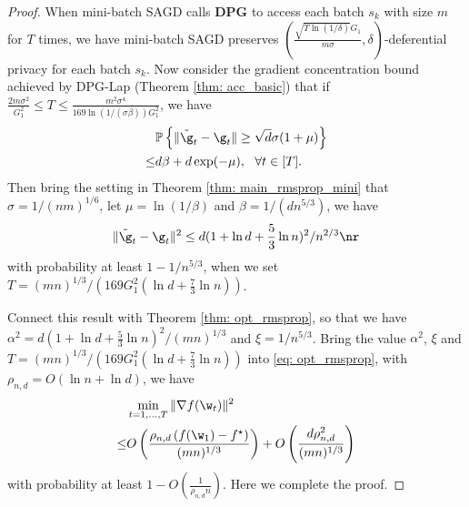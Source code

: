 \theomini*

\begin{proof} When mini-batch SAGD calls \textbf{DPG} to access each batch $s_k$ with size $m$ for $T$ times, we have mini-batch SAGD preserves $(\frac{\sqrt{T \ln(1/\delta)} G_1}{m\sigma}, \delta)$-deferential privacy for each batch $s_k$. Now consider the gradient concentration bound achieved by DPG-Lap (Theorem \ref{thm: acc_basic}) that if $ \frac{2m\sigma^2}{G_1^2}\leq T \leq \frac{m^2 \sigma^4}{169 \ln(1/(\sigma \beta))G_1^2}$, we have 
\begin{align*}
&\mathbb{P}\left\{\|\tilde \g_t - \g_t\| \geq \sqrt{d}\sigma(1+\mu)\right\} \\ 
\leq& d\beta + d\exp(-\mu), \ \ \forall t \in [T]. 
\end{align*}
Then bring the setting in Theorem \ref{thm: main_rmsprop_mini} that $\sigma = 1/(nm)^{1/6}$, let $\mu = \ln (1/\beta)$ and $\beta = 1/(d n^{5/3})$, we have
\begin{equation}
 \|\tilde \g_t - \g_t\|^2 \leq d(1+\ln d + \frac{5}{3}\ln n)^2/n^{2/3}   \nr
\end{equation}
with probability at least $1- 1/n^{5/3}$, when we set\\ $T = (mn)^{1/3}/\left(169G_1^2(\ln d + \frac{7}{3}\ln n)\right)$. 


Connect this result with Theorem \ref{thm: opt_rmsprop}, so that we have $\alpha^2 = d(1+\ln d + \frac{5}{3}\ln n)^2/(mn)^{1/3}$ and $\xi = 1/n^{5/3}$. Bring the value $\alpha^2$, $\xi$ and $T = (mn)^{1/3}/\left(169G_1^2(\ln d + \frac{7}{3}\ln n)\right)$ into \eqref{eq: opt_rmsprop}, with $\rho_{n,d} = O \left(\ln n + \ln d \right)$, we have
\begin{align*}
 &\min_{t = 1,..., T}\|\nabla f(\w_t)\|^2\\
 \leq& O\left( \frac{\rho_{n,d} \left(f(\w_1) - f^\star \right)}{(mn)^{1/3}} \right) + O \left( \frac{d \rho_{n,d}^2}{(mn)^{1/3}}\right)
\end{align*} 
with probability at least $1-O\left(\frac{1}{\rho_{n,d} n}\right)$. Here we complete the proof.

\end{proof}

